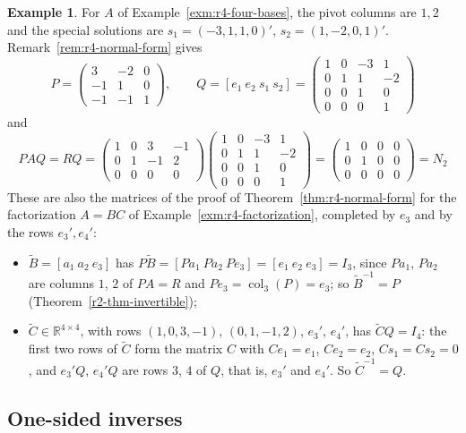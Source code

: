 \documentclass[12pt]{article}
\newcommand{\R}{\mathbb R}
\DeclareMathOperator{\col}{col}
\theoremstyle{definition}
\newtheorem{example}[theorem]{Example}
\begin{document}
\begin{example}\label{exm:r4-normal-form}
For \(A\) of Example~\ref{exm:r4-four-bases}, the pivot columns are \(1,2\) and the special solutions are
\(s_1=(-3,1,1,0)'\), \(s_2=(1,-2,0,1)'\). Remark~\ref{rem:r4-normal-form} gives
\[
P=\begin{pmatrix}3&-2&0\\-1&1&0\\-1&-1&1\end{pmatrix},\qquad
Q=[e_1\ e_2\ s_1\ s_2]=\begin{pmatrix}1&0&-3&1\\0&1&1&-2\\0&0&1&0\\0&0&0&1\end{pmatrix}
\]
and
\[
PAQ=RQ=\begin{pmatrix}1&0&3&-1\\0&1&-1&2\\0&0&0&0\end{pmatrix}\begin{pmatrix}1&0&-3&1\\0&1&1&-2\\0&0&1&0\\0&0&0&1\end{pmatrix}
=\begin{pmatrix}1&0&0&0\\0&1&0&0\\0&0&0&0\end{pmatrix}=N_2
\]
These are also the matrices of the proof of Theorem~\ref{thm:r4-normal-form} for the factorization \(A=BC\) of
Example~\ref{exm:r4-factorization}, completed by \(e_3\) and by the rows \(e_3',e_4'\):
\begin{itemize}
\item \(\tilde B=[a_1\ a_2\ e_3]\) has \(P\tilde B=[Pa_1\ Pa_2\ Pe_3]=[e_1\ e_2\ e_3]=I_3\), since \(Pa_1\), \(Pa_2\) are
columns \(1\), \(2\) of \(PA=R\) and \(Pe_3=\col_3(P)=e_3\); so \(\tilde B^{-1}=P\)
(Theorem~\ref{r2-thm-invertible});
\item \(\tilde C\in\R^{4\times4}\), with rows \((1,0,3,-1)\), \((0,1,-1,2)\), \(e_3'\), \(e_4'\), has \(\tilde CQ=I_4\): the
first two rows of \(\tilde C\) form the matrix \(C\) with \(Ce_1=e_1\), \(Ce_2=e_2\), \(Cs_1=Cs_2=0\), and
\(e_3'Q\), \(e_4'Q\) are rows \(3\), \(4\) of \(Q\), that is, \(e_3'\) and \(e_4'\). So \(\tilde C^{-1}=Q\).
\end{itemize}
\end{example}

\subsection*{One-sided inverses}
\end{document}
